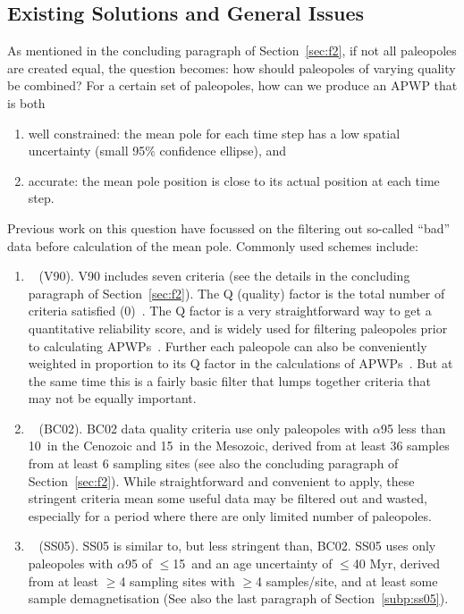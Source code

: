 \subsection{Existing Solutions and General Issues}\label{sec:si}

As mentioned in the concluding paragraph of Section~\ref{sec:f2}, if not all
paleopoles are created equal, the question becomes: how should paleopoles of
varying quality be combined? For a certain set of paleopoles, how can we produce
an APWP that is both
\begin{enumerate}
  \item well constrained: the mean pole for each time step has a low spatial
  uncertainty (small 95\% confidence ellipse), and
  \item accurate: the mean pole position is close to its actual position at each
  time step.
\end{enumerate}

Previous work on this question have focussed on the filtering out so-called
``bad'' data before calculation of the mean pole. Commonly used schemes include:
\begin{enumerate}
  \item~\citet{v90} (V90). V90 includes seven criteria (see the details in the
  concluding paragraph of Section~\ref{sec:f2}). The Q (quality) factor is the
  total number of criteria satisfied (0)~\citep{v88}. The Q factor
  is a very straightforward way to get a quantitative reliability score, and is
  widely used for filtering paleopoles prior to calculating
  APWPs~\citep[e.g.][]{T12,Ma16,F19}. Further each paleopole can also be
  conveniently weighted in proportion to its Q factor in the calculations of
  APWPs~\citep{T92}. But at the same time this is a fairly basic filter that
  lumps together criteria that may not be equally important.
  \item~\citet{B02} (BC02). BC02 data quality criteria use only paleopoles with
  $\alpha$95 less than 10\degree\ in the Cenozoic and 15\degree\ in the
  Mesozoic, derived from at least 36 samples from at least 6 sampling sites (see
  also the concluding paragraph of Section~\ref{sec:f2}). While straightforward and
  convenient to apply, these stringent criteria mean some useful data may be
  filtered out and wasted, especially for a period where there are only limited
  number of paleopoles.
  \item~\citet{S05} (SS05). SS05 is similar to, but less stringent than, BC02.
  SS05 uses only paleopoles with $\alpha$95 of $\leq$15\degree\ and an age
  uncertainty of $\leq$40 Myr, derived from at least $\geq$4 sampling sites with
  $\geq$4 samples/site, and at least some sample demagnetisation (See also the
  last paragraph of Section~\ref{subp:ss05}).
\end{enumerate}

